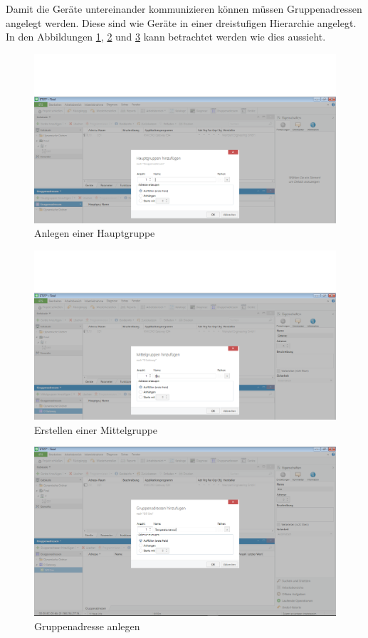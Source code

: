\documentclass[a4paper]{article}
\begin{document}
Damit die Geräte untereinander kommunizieren können müssen Gruppenadressen angelegt werden. Diese sind wie Geräte in einer dreistufigen Hierarchie angelegt. In den Abbildungen \ref{fig:6}, \ref{fig:7} und \ref{fig:8} kann betrachtet werden wie dies aussieht.

\begin{figure}[h!]
	\centering
	\includegraphics[width=13cm]{Doku/6}
	\caption{Anlegen einer Hauptgruppe}
	\label{fig:6}
\end{figure}

\begin{figure}[h!]
	\centering
	\includegraphics[width=13cm]{Doku/7}
	\caption{Erstellen einer Mittelgruppe}
	\label{fig:7}
\end{figure}

\begin{figure}[h!]
	\centering
	\includegraphics[width=13cm]{Doku/8}
	\caption{Gruppenadresse anlegen}
	\label{fig:8}
\end{figure}
\end{document}
